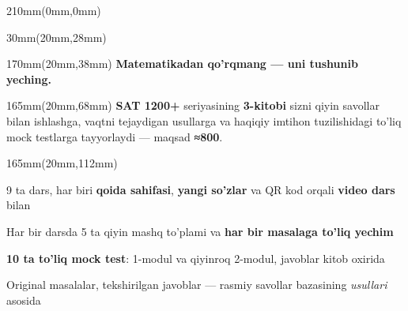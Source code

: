 \documentclass[a4paper]{article}
\begin{document}
\begin{textblock*}{210mm}(0mm,0mm)
\end{textblock*}

\begin{textblock*}{30mm}(20mm,28mm)
\end{textblock*}

\begin{textblock*}{170mm}(20mm,38mm)
{\sffamily\bfseries\fontsize{19}{24}\selectfont\color{ink} Matematikadan qo'rqmang --- uni tushunib yeching.}
\end{textblock*}

\begin{textblock*}{165mm}(20mm,68mm)
{\fontsize{11.5}{17}\selectfont\color{ink}
\textbf{SAT 1200+} seriyasining \textbf{3-kitobi} sizni qiyin savollar bilan ishlashga, vaqtni tejaydigan usullarga va haqiqiy imtihon tuzilishidagi to'liq mock testlarga tayyorlaydi --- maqsad \textbf{≈800}.
}
\end{textblock*}

\begin{textblock*}{165mm}(20mm,112mm)
{\fontsize{11.5}{19}\selectfont\color{ink}
\par\vspace{2.2mm}\noindent\hangindent=7mm \hspace{1mm}{\color{accent}\textbullet}\hspace{3.5mm}9 ta dars, har biri \textbf{qoida sahifasi}, \textbf{yangi so'zlar} va QR kod orqali \textbf{video dars} bilan
\par\vspace{2.2mm}\noindent\hangindent=7mm \hspace{1mm}{\color{accent}\textbullet}\hspace{3.5mm}Har bir darsda 5 ta qiyin mashq to'plami va \textbf{har bir masalaga to'liq yechim}
\par\vspace{2.2mm}\noindent\hangindent=7mm \hspace{1mm}{\color{accent}\textbullet}\hspace{3.5mm}\textbf{10 ta to'liq mock test}: 1-modul va qiyinroq 2-modul, javoblar kitob oxirida
\par\vspace{2.2mm}\noindent\hangindent=7mm \hspace{1mm}{\color{accent}\textbullet}\hspace{3.5mm}Original masalalar, tekshirilgan javoblar --- rasmiy savollar bazasining \emph{usullari} asosida\par
}
\end{textblock*}
\end{document}
